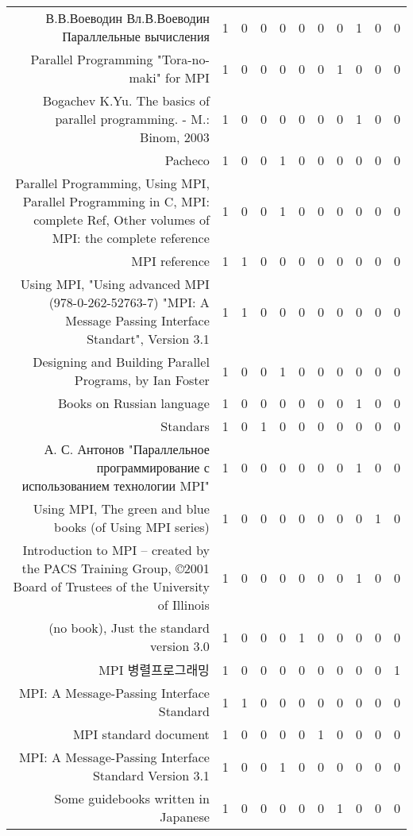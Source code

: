 {\begin{landscape}
\begin{longtable}[htb]{r|c|c|c|c|c|c|c|c|c|c}
{В.В.Воеводин Вл.В.Воеводин Параллельные вычисления} & 1 & 0 & 0 & 0 & 0 & 0 & 0 & 1 & 0 & 0 \\%
{Parallel Programming "Tora-no-maki" for MPI} & 1 & 0 & 0 & 0 & 0 & 0 & 1 & 0 & 0 & 0 \\%
{Bogachev K.Yu. The basics of parallel programming. - M.: Binom, 2003} & 1 & 0 & 0 & 0 & 0 & 0 & 0 & 1 & 0 & 0 \\%
{Pacheco} & 1 & 0 & 0 & 1 & 0 & 0 & 0 & 0 & 0 & 0 \\%
{Parallel Programming, Using MPI, Parallel Programming in C, MPI: complete Ref, Other volumes of MPI: the complete reference} & 1 & 0 & 0 & 1 & 0 & 0 & 0 & 0 & 0 & 0 \\%
{MPI reference} & 1 & 1 & 0 & 0 & 0 & 0 & 0 & 0 & 0 & 0 \\%
{Using MPI, "Using advanced MPI (978-0-262-52763-7)  "MPI: A Message Passing Interface Standart", Version 3.1} & 1 & 1 & 0 & 0 & 0 & 0 & 0 & 0 & 0 & 0 \\%
{Designing and Building Parallel Programs, by Ian Foster} & 1 & 0 & 0 & 1 & 0 & 0 & 0 & 0 & 0 & 0 \\%
{Books on Russian language} & 1 & 0 & 0 & 0 & 0 & 0 & 0 & 1 & 0 & 0 \\%
{Standars} & 1 & 0 & 1 & 0 & 0 & 0 & 0 & 0 & 0 & 0 \\%
{А. С. Антонов "Параллельное программирование с использованием технологии MPI"} & 1 & 0 & 0 & 0 & 0 & 0 & 0 & 1 & 0 & 0 \\%
{Using MPI, The green and blue books (of Using MPI series)} & 1 & 0 & 0 & 0 & 0 & 0 & 0 & 0 & 1 & 0 \\%
{Introduction to MPI – created by the PACS Training Group, ©2001 Board of Trustees of the University of Illinois} & 1 & 0 & 0 & 0 & 0 & 0 & 0 & 1 & 0 & 0 \\%
{(no book), Just the standard version 3.0} & 1 & 0 & 0 & 0 & 1 & 0 & 0 & 0 & 0 & 0 \\%
{MPI 병렬프로그래밍} & 1 & 0 & 0 & 0 & 0 & 0 & 0 & 0 & 0 & 1 \\%
{MPI: A Message-Passing Interface Standard} & 1 & 1 & 0 & 0 & 0 & 0 & 0 & 0 & 0 & 0 \\%
{MPI standard document} & 1 & 0 & 0 & 0 & 0 & 1 & 0 & 0 & 0 & 0 \\%
{MPI: A Message-Passing Interface Standard Version 3.1} & 1 & 0 & 0 & 1 & 0 & 0 & 0 & 0 & 0 & 0 \\%
{Some guidebooks written in Japanese} & 1 & 0 & 0 & 0 & 0 & 0 & 1 & 0 & 0 & 0 \\%

\end{longtable}
\end{landscape}}
